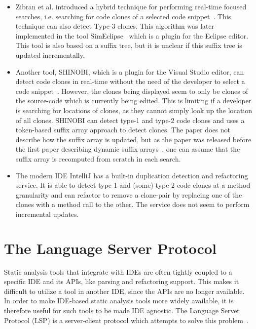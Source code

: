 \begin{itemize}

    \item Zibran et al. introduced a hybrid technique for performing real-time focused
        searches, i.e. searching for code clones of a selected code
        snippet~\cite{Zibran_real_time_search}. This technique can also detect Type-3
        clones. This algorithm was later implemented in the tool
        SimEclipse~\cite{Udding_Towards_Convenient_Management} which is a plugin for the
        Eclipse editor. This tool is also based on a suffix tree, but it is unclear if
        this suffix tree is updated incrementally.

    \item Another tool, SHINOBI, which is a plugin for the Visual Studio editor, can
        detect code clones in real-time without the need of the developer to select a code
        snippet~\cite{SHINOBI}. However, the clones being displayed seem to only be clones
        of the source-code which is currently being edited. This is limiting if a
        developer is searching for locations of clones, as they cannot simply look up the
        location of all clones. SHINOBI can detect type-1 and type-2 code clones and uses
        a token-based suffix array approach to detect clones. The paper does not describe
        how the suffix array is updated, but as the paper was released before the first
        paper describing dynamic suffix arrays~\cite{DynamicExtendedSuffixArrays}, one can
        assume that the suffix array is recomputed from scratch in each search.

    \item The modern IDE IntelliJ has a built-in duplication detection and refactoring
        service. It is able to detect type-1 and (some) type-2 code clones at a method
        granularity and can refactor to remove a clone-pair by replacing one of the clones
        with a method call to the other. The service does not seem to perform incremental
        updates.

\end{itemize}

\section{The Language Server Protocol}

Static analysis tools that integrate with IDEs are often tightly coupled to a specific IDE
and its APIs, like parsing and refactoring support. This makes it difficult to utilize a
tool in another IDE, since the APIs are no longer available. In order to make IDE-based
static analysis tools more widely available, it is therefore useful for such tools to be
made IDE agnostic. The Language Server Protocol (LSP) is a server-client protocol which
attempts to solve this problem~\cite{lsp}.

